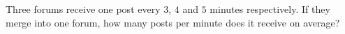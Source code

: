 Three forums receive one post every $3$, $4$ and $5$ minutes respectively. If they merge into one forum, how many posts per minute does it receive on average?
